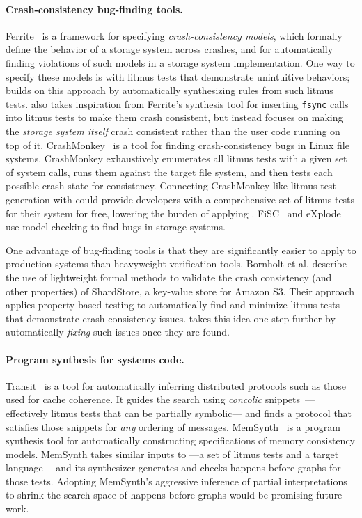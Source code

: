 \paragraph{Crash-consistency bug-finding tools.}
Ferrite~\cite{bornholt:ferrite} is a framework for specifying \emph{crash-consistency models},
which formally define the behavior of a storage system across crashes,
and for automatically finding violations of such models in a storage system implementation.
One way to specify these models is with litmus tests that demonstrate unintuitive behaviors;
\depsynth builds on this approach by automatically synthesizing rules from such litmus tests.
\depsynth also takes inspiration from Ferrite's synthesis tool
for inserting \texttt{fsync} calls into litmus tests to make them crash consistent,
but instead focuses on making the \emph{storage system itself} crash consistent
rather than the user code running on top of it.
CrashMonkey~\cite{mohan:crashmonkey} is a tool for finding crash-consistency bugs in Linux file systems.
CrashMonkey exhaustively enumerates all litmus tests with a given set of system calls,
runs them against the target file system,
and then tests each possible crash state for consistency.
Connecting CrashMonkey-like litmus test generation with \depsynth
could provide developers with a comprehensive set of litmus tests for their system for free,
lowering the burden of applying \depsynth.
FiSC~\cite{yang:fisc} and eXplode~\cite{yang:explode}
use model checking to find bugs in storage systems.

One advantage of bug-finding tools is that they are significantly easier to apply to production systems
than heavyweight verification tools.
Bornholt et al. \cite{bornholt:s3} describe the use of lightweight formal methods
to validate the crash consistency (and other properties)
of ShardStore, a key-value store for Amazon S3.
Their approach applies property-based testing to automatically find and minimize litmus tests
that demonstrate crash-consistency issues.
\depsynth takes this idea one step further by automatically \emph{fixing} such issues once they are found.

\paragraph{Program synthesis for systems code.}
Transit~\cite{udupa:transit} is a tool for automatically inferring distributed protocols
such as those used for cache coherence.
It guides the search using \emph{concolic} snippets~\cite{sen:concolic}---%
effectively litmus tests that can be partially symbolic---%
and finds a protocol that satisfies those snippets for \emph{any} ordering of messages.
MemSynth~\cite{bornholt:memsynth} is a program synthesis tool for
automatically constructing specifications of memory consistency models.
MemSynth takes similar inputs to \depsynth---a set of litmus tests and a target language---%
and its synthesizer generates and checks happens-before graphs for those tests.
Adopting MemSynth's aggressive inference of partial interpretations~\cite{torlak:kodkod}
to shrink the search space of happens-before graphs would be promising future work.

